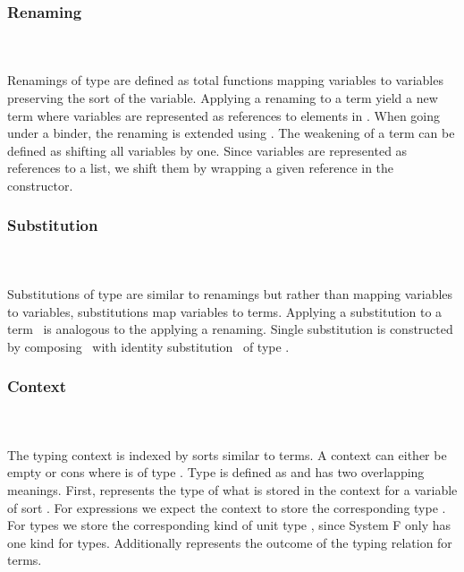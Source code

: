 \subsubsection{Renaming}\hfill\\\\
Renamings  of type    are defined as total functions mapping variables    to variables    preserving the sort  of the variable.
\FRen
Applying a renaming    to a term    yield a new term    where variables are represented as references    to elements in .
\Fren
When going under a binder, the renaming is extended using \Frenext. 
The weakening of a term can be defined as shifting all variables by one.
\Fwk 
Since variables are represented as references to a list, we shift them by wrapping a given reference in the  constructor.

\subsubsection{Substitution}\hfill\\\\
Substitutions  of type    are similar to renamings but rather than mapping variables to variables, substitutions map variables to terms.
\FSub
Applying a substitution to a term \Fsub\ is analogous to the applying a renaming. 
Single substitution is constructed by composing \Fsinglesub\ with identity substitution \Fidsub\ of type  .
\Fsubs

\subsubsection{Context}\hfill\\\\
The typing context   is indexed by sorts  similar to terms. 
\FCtx
A context can either be empty  or cons    where  is of type   . 
Type    is defined as 
\FTypes
and has two overlapping meanings. 
First,    represents the type of what is stored in the context for a variable of sort . 
For expressions  we expect the context to store the corresponding type .
For types  we store the corresponding kind of unit type , since System F only has one kind for types.
Additionally    represents the outcome of the typing relation    \Data{:}  for terms.

